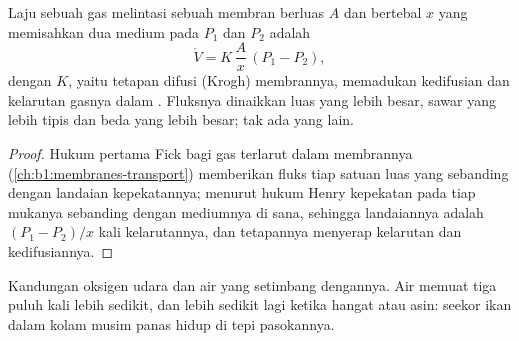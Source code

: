 \begin{theorem}\label{thm:b1:gas-exchange:fick}
Laju sebuah gas melintasi sebuah membran berluas $A$ dan bertebal $x$
yang memisahkan dua medium pada  $P_1$ dan $P_2$ adalah
\[
\dot V = K\,\frac{A}{x}\,(P_1 - P_2),
\]
dengan $K$, yaitu tetapan difusi (Krogh) membrannya, memadukan
kedifusian dan kelarutan gasnya dalam . Fluksnya dinaikkan
luas yang lebih besar, sawar yang lebih tipis dan beda 
yang lebih besar; tak ada yang lain.
\end{theorem}
\begin{proof}
Hukum pertama Fick bagi gas terlarut dalam membrannya
(\cref{ch:b1:membranes-transport}) memberikan fluks tiap satuan luas
yang sebanding dengan landaian kepekatannya; menurut hukum Henry
kepekatan pada tiap mukanya sebanding dengan  mediumnya
di sana, sehingga landaiannya adalah $(P_1 - P_2)/x$ kali kelarutannya,
dan tetapannya menyerap kelarutan dan kedifusiannya.
\end{proof}

\begin{omfigure}

{\small Kandungan oksigen udara dan air yang setimbang dengannya. Air
memuat tiga puluh kali lebih sedikit, dan lebih sedikit lagi ketika
hangat atau asin: seekor ikan dalam kolam musim panas hidup di tepi
pasokannya.}
\end{omfigure}

